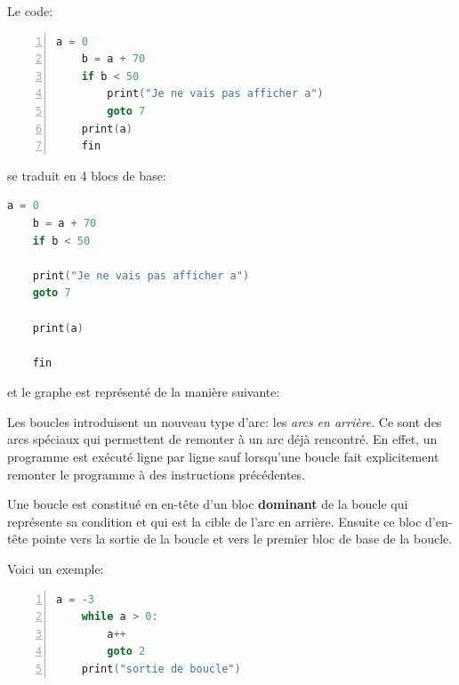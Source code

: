 Le code:
\begin{lstlisting}[language=c, numbers=left, xleftmargin=.35\textwidth]
    a = 0
    b = a + 70
    if b < 50
        print("Je ne vais pas afficher a")
        goto 7
    print(a)
    fin
\end{lstlisting}
se traduit en 4 blocs de base:
\begin{lstlisting}[language=c, xleftmargin=.26\textwidth]
    a = 0
    b = a + 70
    if b < 50

    print("Je ne vais pas afficher a")
    goto 7

    print(a)

    fin
\end{lstlisting}
et le graphe est représenté de la manière suivante:
\begin{center}
\end{center}

Les boucles introduisent un nouveau type d'arc: les \textit{arcs en arrière}. Ce sont des arcs spéciaux qui permettent de remonter à un arc déjà rencontré. En effet, un programme est exécuté ligne par ligne sauf lorsqu'une boucle fait explicitement remonter le programme à des instructions précédentes. 

Une boucle est constitué en en-tête d'un bloc \textbf{dominant} de la boucle qui représente sa condition et qui est la cible de l'arc en arrière. Ensuite ce bloc d'en-tête pointe vers la sortie de la boucle et vers le premier bloc de base de la boucle.

Voici un exemple:
\begin{lstlisting}[numbers=left, language=c, xleftmargin=.35\textwidth]
    a = -3
    while a > 0:
        a++
        goto 2
    print("sortie de boucle")
\end{lstlisting}

